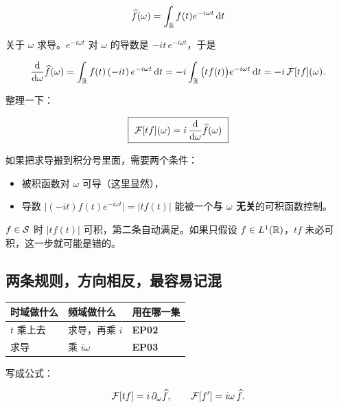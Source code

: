 \begin{equation}
\widehat{f}(\omega)=\int_{\mathbb{R}}f(t)e^{-i\omega t}\mathop{}\!\mathrm{d} t
\end{equation}

关于 $\omega$ 求导。$e^{-i\omega t}$ 对 $\omega$ 的导数是 $-it\,e^{-i\omega t}$，于是

\begin{equation}
\frac{\mathop{}\!\mathrm{d}}{\mathop{}\!\mathrm{d}\omega}\widehat{f}(\omega)
=\int_{\mathbb{R}}f(t)\,(-it)\,e^{-i\omega t}\mathop{}\!\mathrm{d} t
=-i\int_{\mathbb{R}}\big(tf(t)\big)e^{-i\omega t}\mathop{}\!\mathrm{d} t
=-i\,\mathcal{F}[tf](\omega).
\end{equation}

整理一下：

\begin{equation}
\boxed{\ \F[tf](\omega)=i\,\frac{\dd}{\dd\omega}\fh(\omega)\ }\label{eq:mult-t}
\end{equation}

\begin{ideabox}[为什么必须写“$f\in\Sv$”]
如果把求导搬到积分号里面，需要两个条件：
\begin{itemize}[leftmargin=1.4em,itemsep=0.2em]
\item 被积函数对 $\omega$ 可导（这里显然），
\item 导数 $\big|(-it)f(t)e^{-i\omega t}\big|=|tf(t)|$ 能被一个\textbf{与 $\omega$ 无关}的可积函数控制。
\end{itemize}
$f\in\Sv$ 时 $|tf(t)|$ 可积，第二条自动满足。如果只假设 $f\in L^1(\mathbb{R})$，$tf$ 未必可积，这一步就可能是错的。
\end{ideabox}

\subsection{两条规则，方向相反，最容易记混}

\begin{center}
\small
\renewcommand{\arraystretch}{1.45}
\begin{tabularx}{\textwidth}{@{}L{5.2cm}L{5.4cm}Y@{}}
\toprule
时域做什么 & 频域做什么 & 用在哪一集 \\
\midrule
$t$ 乘上去 & 求导，再乘 $i$ & \textbf{EP02} \\
求导 & 乘 $i\omega$ & \textbf{EP03} \\
\bottomrule
\end{tabularx}
\end{center}

写成公式：

\begin{equation}
\mathcal{F}[tf]=i\,\partial_\omega\widehat{f},
\qquad
\mathcal{F}[f']=i\omega\,\widehat{f} .\label{eq:two-rules}
\end{equation}

